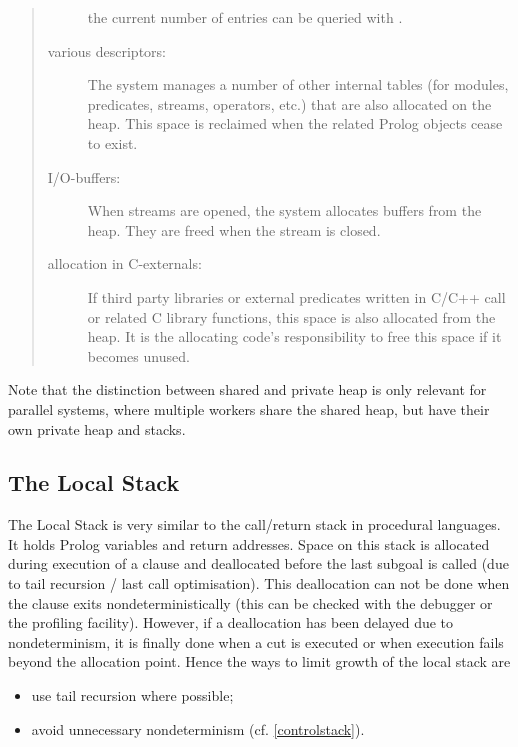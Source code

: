 \begin{quote}
\begin{description}
the current number of entries can be queried with
.
\item [various descriptors:]
The system manages a number of other internal tables (for modules, predicates,
streams, operators, etc.) that are also allocated on the heap.
This space is reclaimed when the related Prolog objects cease to exist.
\item [I/O-buffers:]
When streams are opened, the system allocates buffers from the
heap. They are freed when the stream is closed.
\item [allocation in C-externals:]
If third party libraries or external predicates written in C/C++ call
 or related C library functions, this space is also allocated
from the heap.  It is the allocating code's responsibility to free
this space if it becomes unused.
\end{description}
\end{quote}
Note that the distinction between shared and private heap is only relevant for
parallel \eclipse{} systems, where multiple workers share the shared
heap, but have their own private heap and stacks.


\subsection{The Local Stack}
The Local Stack is very similar to the call/return stack in procedural
languages.
It holds Prolog variables and return addresses.
Space on this stack is allocated during execution of a clause and deallocated
before the last subgoal is called (due to tail recursion / last call
optimisation).
This deallocation can not be done when the clause exits nondeterministically
(this can be checked with the debugger or the profiling facility).
However, if a deallocation has been delayed due to nondeterminism, it is
finally done when a cut is executed or when execution fails beyond
the allocation point.
Hence the ways to limit growth of the local stack are
\begin{itemize}
\item use tail recursion where possible;
\item avoid unnecessary nondeterminism (cf. \ref{controlstack}).
\end{itemize}


